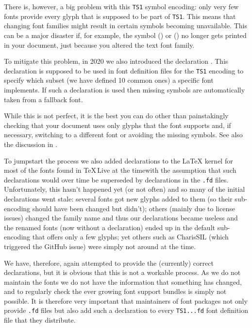 \documentclass{ltnews}
\providecommand\Dash {\unskip \textemdash}
\providecommand\TL{\TeX\,Live}
\begin{document}
There is, however, a big problem with this \texttt{TS1} symbol
encoding: only very few fonts provide every glyph that is supposed
to be part of \texttt{TS1}. This means that changing font families
might result in certain symbols becoming unavailable. This can be a
major disaster if, for example,
the symbol  (\texteuro) or  (\textohm)
no longer gets printed in your document, just because you altered the
text font family.

To mitigate this problem, in 2020 we also introduced the declaration
. This declaration is supposed to be used in
font definition files for the \texttt{TS1} encoding to specify which
subset (we have defined 10 common ones) a specific font implements. If
such a declaration is used then missing symbols are automatically
taken from a fallback font.

While this is not perfect, it is the best
you can do other than painstakingly checking that your document
uses only glyphs that the font supports
and, if necessary, switching to a different font or avoiding the
missing symbols. See also the discussion in \cite{39:ltnews33}.

To jumpstart the process we also added declarations to the \LaTeX{}
kernel for most of the fonts found in \TL{} at the time\Dash with
the assumption that such declarations would over time be superseded by
declarations in the \texttt{.fd} files. Unfortunately, this hasn't
happened yet (or not often) and so many of the initial declarations
went stale: several fonts got new glyphs added to them (so their
sub-encoding should have been changed but didn't); others (mainly due
to license issues) changed the family name and thus our declarations
became useless and the renamed fonts (now without a declaration) ended
up in the default sub-encoding that offers only a few glyphs;
yet others such as CharisSIL (which triggered the GitHub issue) were
simply not around at the time.

We have, therefore, again attempted to provide the (currently) correct
declarations, but it is obvious that this is not a workable
process. As we do not maintain the fonts we do not have the
information that something has changed, and to regularly check the
ever growing font support bundles is simply not possible. It is
therefore very important that maintainers of font packages not only
provide \texttt{.fd} files but also add such a declaration to every
\texttt{TS1...fd} font definition file that they distribute.
\end{document}
